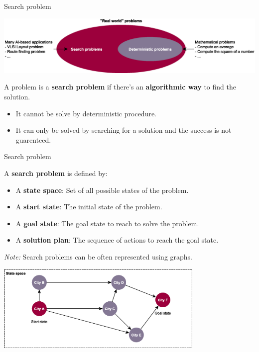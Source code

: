 \documentclass[9pt]{beamer}
\begin{document}
\begin{frame}{Search problem}
\begin{small}

\begin{center}
    \includegraphics[keepaspectratio, width=1.0\linewidth]{images/problems.eps}
\end{center}

A problem is a \textbf{search problem} if there's an \textbf{algorithmic way} to find the solution.
\vspace{-3mm}
\begin{itemize}
    \item It cannot be solve by deterministic procedure.
    \item It can only be solved by searching for a solution and the success is not guarenteed.
\end{itemize}
\end{small}
\end{frame}


\begin{frame}{Search problem}
\begin{small}

A \textbf{search problem} is defined by:
\vspace{-3mm}
\begin{itemize}
    \item A \textbf{state space}: Set of all possible states of the problem.
    \item A \textbf{start state}: The initial state of the problem.
    \item A \textbf{goal state}: The goal state to reach to solve the problem.
    \item A \textbf{solution plan}: The sequence of actions to reach the goal state.
\end{itemize}

\vspace{-2mm}

\emph{Note:} Search problems can be often represented using graphs.

\begin{center}
    \includegraphics[keepaspectratio, width=0.75\textwidth]{images/h_example_0.eps}
\end{center}

\end{small}
\end{frame}
\end{document}
